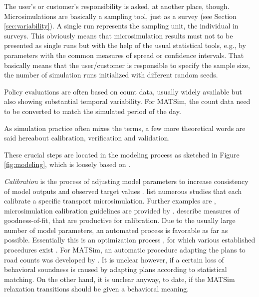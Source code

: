 The user's or customer's responsibility is asked, at another place, though. Microsimulations are basically a sampling tool, just as a survey (see Section \ref{sec:variability}). A single run represents the sampling unit, the individual in surveys. This obviously means that microsimulation results must not to be presented as single runs but with the help of the usual statistical tools, e.g., by parameters with the common measures of spread or confidence intervals. That basically means that the user/customer is responsible to specify the sample size, the number of simulation runs initialized with different random seeds. 

Policy evaluations are often based on count data, usually widely available but also showing substantial temporal variability. For MATSim, the count data need to be converted to match the simulated period of the day.

As simulation practice often mixes the terms, a few more theoretical words are said hereabout calibration, verification and validation. 

These crucial steps are located in the modeling process as sketched in Figure \ref{fig:modeling}, which is loosely based on \citet[][Figure 10.2]{Petty_SokolowskiBanks_2010}. 

\emph{Calibration} is the process of adjusting model parameters to increase consistency of model outputs and observed target values \citep[][p.348]{HollanderLiu_Transportation_2007} \citep[see also][]{TrucanoEtAl_RESS_2006}. \citet[][Table 1]{HollanderLiu_Transportation_2007} list numerous studies that each calibrate a specific transport microsimulation. Further examples are \citet[][]{SmithEtAl_JTE_2008, KimEtAl_TRR_2005, RutterEtAl_JASA_2009}, microsimulation calibration guidelines are provided by \citet[][]{MilamChao_TRBATPM_2001, WegmannEverett_TechRep_CTRUT_2008, DowlingEtAl_manual_2002}. \citet[][Table 2]{HollanderLiu_Transportation_2007} describe measures of goodness-of-fit, that are productive for calibration. Due to the usually large number of model parameters, an automated process is favorable as far as possible. Essentially this is an optimization process \citep[][p.353]{HollanderLiu_Transportation_2007}, for which various established procedures exist \citep[e.g.,][p.41ff]{ZhangMa_ResRep_PATH_2008}. For MATSim, an automatic procedure adapting the plans to road counts was developed by \citet[][]{FloetteroedEtAl_TechRep_TRANSPOR_2008}. It is unclear however, if a certain loss of behavioral soundness is caused by adapting plans according to statistical matching. On the other hand, it is unclear anyway, to date, if the MATSim relaxation transitions should be given a behavioral meaning.

